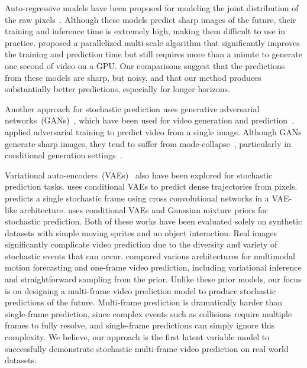 \documentclass{article} \usepackage{iclr2018_conference,times}
\begin{document}
Auto-regressive models have been proposed for modeling the joint distribution of the raw pixels~\citep{kalchbrenner2016video}. Although these models predict sharp images of the future, their training and inference time is extremely high, making them difficult to use in practice. \cite{reed2017parallel} proposed a parallelized multi-scale algorithm that significantly improves the training and prediction time but still requires more than a minute to generate one second of  video on a GPU. Our comparisons suggest that the predictions from these models are sharp, but noisy, and that our method produces substantially better predictions, especially for longer horizons.

Another approach for stochastic prediction uses generative adversarial networks~(GANs)~\citep{goodfellow2014generative}, which have been used for video generation and prediction~\citep{tulyakov2017mocogan,li2017video}.
\cite{vondrick2016generating,chen2017video} applied adversarial training to predict video from a single image.
Although GANs generate sharp images, they tend to suffer from mode-collapse~\citep{goodfellow2016nips}, particularly in conditional generation settings~\citep{isola2016image}.



Variational auto-encoders~(VAEs)~\citep{kingma2013auto} also have been explored for stochastic prediction tasks. \cite{walker2016uncertain} uses conditional VAEs to predict dense trajectories from pixels. \cite{xue2016visual} predicts a single stochastic frame using cross convolutional networks in a VAE-like architecture. \cite{shu2016stochastic} uses conditional VAEs and Gaussian mixture priors for stochastic prediction.
Both of these works have been evaluated solely on synthetic datasets with simple moving sprites and no object interaction. Real images significantly complicate video prediction due to the diversity and variety of stochastic events that can occur. 
\cite{fragkiadaki2017motion} compared various architectures for multimodal motion forecasting and one-frame video prediction, including variational inference and straightforward sampling from the prior. Unlike these prior models, our focus is on designing a multi-frame video prediction model to produce stochastic predictions of the future. Multi-frame prediction is dramatically harder than single-frame prediction, since complex events such as collisions require multiple frames to fully resolve, and single-frame predictions can simply ignore this complexity. We believe, our approach is the first latent variable model to successfully demonstrate stochastic multi-frame video prediction on real world datasets.
\end{document}
